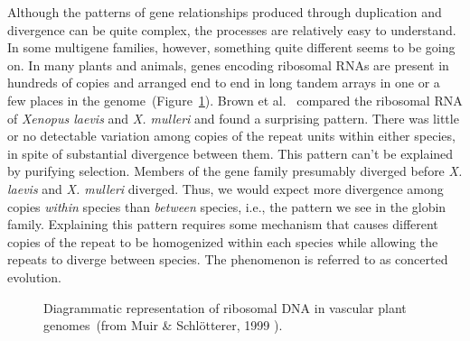 Although the patterns of gene relationships produced through
duplication and divergence can be quite complex, the processes are
relatively easy to understand. In some multigene families, however,
something quite different seems to be going on. In many plants and
animals, genes encoding ribosomal RNAs are present in hundreds of
copies and arranged end to end in long tandem arrays in one or a few
places in the genome~(Figure~\ref{fig:rdna}). Brown et
al.~\cite{Brown-etal72} compared the ribosomal RNA of {\it Xenopus
  laevis\/} and {\it X. mulleri\/} and found a surprising
pattern. There was little or no detectable variation among copies of
the repeat units within either species, in spite of substantial
divergence between them. This pattern can't be explained by purifying
selection. Members of the gene family presumably diverged before {\it
  X. laevis\/} and {\it X. mulleri\/} diverged. Thus, we would expect
more divergence among copies {\it within\/} species than {\it
  between\/} species, i.e., the pattern we see in the globin
family. Explaining this pattern requires some mechanism that causes
different copies of the repeat to be homogenized within each species
while allowing the repeats to diverge between species. The phenomenon
is referred to as concerted evolution.

\begin{figure}
\begin{center}
\end{center}
\caption{Diagrammatic representation of ribosomal DNA in vascular
  plant genomes~(from Muir \& Schl{\"o}tterer, 1999
  ).}\label{fig:rdna}
\end{figure}

